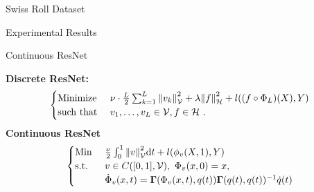 \documentclass[8pt]{beamer}
\newcommand{\cH}{\mathcal{H}}
\newcommand{\cV}{\mathcal{V}}
\newcommand{\bGamma}{\mathbf{\Gamma}}
\begin{document}
	\begin{frame}{Swiss Roll Dataset}
		
	\end{frame}

	\begin{frame}{Experimental Results}
		
	\end{frame}

	\begin{frame}{Continuous ResNet}
		
		\textbf{Discrete ResNet:}
		\begin{equation*}
		\label{prob:min-v-f}
			\begin{cases}
				\text{Minimize~} & \nu \cdot \frac{L}{2} \sum_{k=1}^{L} \norm{v_k}_\cV^2
				+ \lambda \norm{f}_\cH^2 
				+ l((f \circ \Phi_L)(X), Y) \\
				\text{such that~} & v_1, \ldots, v_L \in \cV, f \in \cH \ .
			\end{cases}
		\end{equation*}
		\textbf{Continuous ResNet}
		\begin{equation*}
			\begin{cases}
				\text{Min~}& \frac{\nu}{2} \int_{0}^{1} \norm{v}_\mathcal{V}^2 \mathrm{d}t
				+ l(\phi_v(X, 1), Y)\\
				\text{s.t.~}& v \in C([0, 1], \mathcal{V}),\ \Phi_v(x, 0) = x,\\
				&\dot{\Phi}_v(x, t) = \mathbf{\Gamma}(\Phi_v(x, t), q(t)) \bGamma(q(t), q(t))^{-1} \dot{q}(t)
			\end{cases}
		\end{equation*}
	\end{frame}


	\begin{frame}
		
		
	\end{frame}
\end{document}

